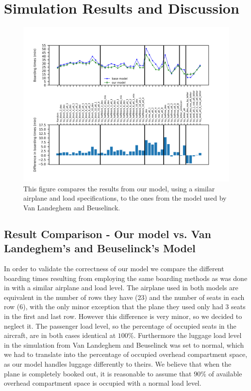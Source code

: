 \documentclass[11pt]{article}
\begin{document}
\section{Simulation Results and Discussion}
\begin{figure}
	\includegraphics[width=\linewidth]{../../code/AirplaneBoarding/data/figure1/figure1.png}
	\caption{This figure compares the results from our model, using a similar airplane and load specifications, to the ones from the model used by Van Landeghem and Beuselinck.}
	\label{figure1}
\end{figure}
\subsection{Result Comparison - Our model vs. Van Landeghem's and Beuselinck's Model}
In order to validate the correctness of our model we compare the different boarding times resulting from employing the same boarding methods as was done in \cite{beus} with a similar airplane and load level. The airplane used in both models are equivalent in the number of rows they have (23) and the number of seats in each row (6), with the only minor exception that the plane they used only had 3 seats in the first and last row. However this difference is very minor, so we decided to neglect it. The passenger load level, so the percentage of occupied seats in the aircraft, are in both cases identical at $100\%$. Furthermore the luggage load level in the simulation from Van Landeghem and Beuselinck was set to normal, which we had to translate into the percentage of occupied overhead compartment space, as our model handles luggage differently to theirs. We believe that when the plane is completely booked out, it is reasonable to assume that $90\%$ of available overhead compartment space is occupied with a normal load level.
\end{document}
